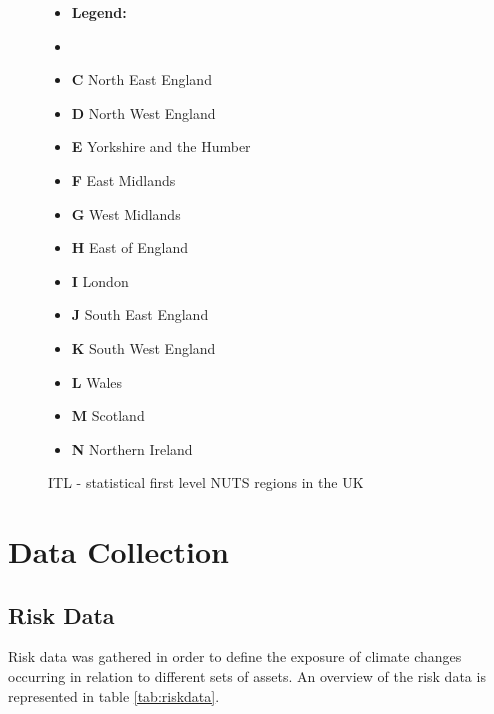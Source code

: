\documentclass[10pt,a4paper]{article}
\begin{document}
\begin{figure}[H]\hspace{1.25cm}
  \begin{minipage}{.5\textwidth}\hspace{.75cm}
      \resizebox{0.8\textwidth}{!}{}
  \end{minipage}%
  \begin{minipage}{.5\textwidth}
    \vspace{-1cm}
    \begin{itemize}
            \item[] \hspace{-.5cm}\textbf{Legend:}
            \item[]
            \item \textbf{C} North East England
            \item \textbf{D} North West England
            \item \textbf{E} Yorkshire and the Humber
            \item \textbf{F} East Midlands
            \item \textbf{G} West Midlands
            \item \textbf{H} East of England
            \item \textbf{I} London
            \item \textbf{J} South East England
            \item \textbf{K} South West England
            \item \textbf{L} Wales
            \item \textbf{M} Scotland
            \item \textbf{N} Northern Ireland
        \end{itemize}
    \end{minipage}
    \vspace{.25cm}
    \caption{ITL - statistical first level NUTS regions in the UK 
    \label{fig:ITLUk}
    \cite{zotero-176}}
\end{figure}
\newpage
\section{Data Collection} \label{sec:data}

\subsection{Risk Data}
Risk data was gathered in order to define the exposure of climate changes occurring in relation to different sets of assets. An overview of the risk data is represented in table \ref{tab:riskdata}.
\end{document}
